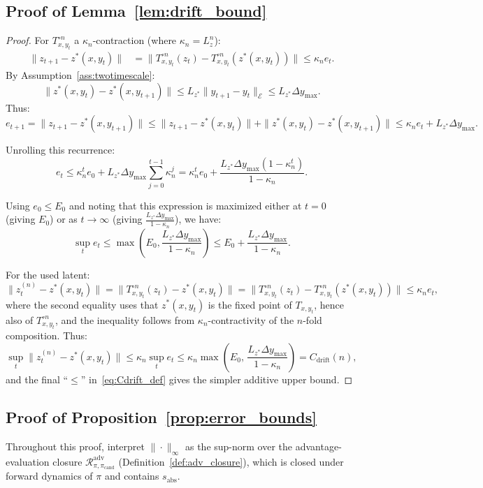 \documentclass{article}
\theoremstyle{plain}
\theoremstyle{definition}
\theoremstyle{remark}
\newcommand{\Cdrift}{C_{\mathrm{drift}}}
\begin{document}
\subsection{Proof of Lemma~\ref{lem:drift_bound}}

\begin{proof}
For $T_{x,y_t}^{\circ n}$ a $\kappa_n$-contraction (where $\kappa_n = L_z^n$):
\begin{align*}
\|z_{t+1} - z^*(x,y_t)\| &= \|T_{x,y_t}^{\circ n}(z_t) - T_{x,y_t}^{\circ n}(z^*(x,y_t))\| \le \kappa_n e_t.
\end{align*}
By Assumption~\ref{ass:twotimescale}:
\[
\|z^*(x,y_t) - z^*(x,y_{t+1})\| \le L_{z^*}\|y_{t+1}-y_t\|_{\mathcal{E}} \le L_{z^*}\Delta y_{\max}.
\]
Thus:
\[
e_{t+1} = \|z_{t+1} - z^*(x,y_{t+1})\| \le \|z_{t+1} - z^*(x,y_t)\| + \|z^*(x,y_t) - z^*(x,y_{t+1})\| \le \kappa_n e_t + L_{z^*}\Delta y_{\max}.
\]

Unrolling this recurrence:
\[
e_t \le \kappa_n^t e_0 + L_{z^*}\Delta y_{\max} \sum_{j=0}^{t-1} \kappa_n^j = \kappa_n^t e_0 + \frac{L_{z^*}\Delta y_{\max}(1 - \kappa_n^t)}{1-\kappa_n}.
\]

Using $e_0 \le E_0$ and noting that this expression is maximized either at $t=0$ (giving $E_0$) or as $t \to \infty$ (giving $\frac{L_{z^*}\Delta y_{\max}}{1-\kappa_n}$), we have:
\[
\sup_t e_t \le \max\left(E_0, \frac{L_{z^*}\Delta y_{\max}}{1-\kappa_n}\right) \le E_0 + \frac{L_{z^*}\Delta y_{\max}}{1-\kappa_n}.
\]

For the used latent:
\[
\|z_t^{(n)} - z^*(x,y_t)\| = \|T_{x,y_t}^{\circ n}(z_t) - z^*(x,y_t)\|
= \|T_{x,y_t}^{\circ n}(z_t) - T_{x,y_t}^{\circ n}(z^*(x,y_t))\| \le \kappa_n e_t,
\]
where the second equality uses that $z^*(x,y_t)$ is the fixed point of $T_{x,y_t}$,
hence also of $T_{x,y_t}^{\circ n}$, and the inequality follows from
$\kappa_n$-contractivity of the $n$-fold composition.
Thus:
\[
\sup_t \|z_t^{(n)} - z^*(x,y_t)\|
\le
\kappa_n \sup_t e_t
\le
\kappa_n \max\!\left(E_0,\,\frac{L_{z^*}\Delta y_{\max}}{1-\kappa_n}\right)
=
\Cdrift(n),
\]
and the final ``$\le$'' in~\eqref{eq:Cdrift_def} gives the simpler additive upper bound.
\end{proof}

\subsection{Proof of Proposition~\ref{prop:error_bounds}}
Throughout this proof, interpret $\|\cdot\|_\infty$ as the sup-norm over the advantage-evaluation closure $\mathcal{R}_{\pi,\pi_{\mathrm{cand}}}^{\mathrm{adv}}$ (Definition~\ref{def:adv_closure}), which is closed under forward dynamics of $\pi$ and contains $s_{\mathrm{abs}}$.
\end{document}
